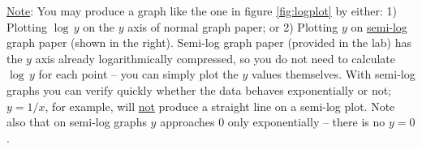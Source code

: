 \begin{minipage}[h]{0.7\textwidth}
    \underline{Note}: You may produce a graph like the one in figure \ref{fig:logplot} by either: 1) Plotting $\log\,y$ on the $y$ axis of normal graph paper; or 2) Plotting $y$ on \underline{semi-log} graph paper (shown in the right). Semi-log graph paper (provided in the lab) has the $y$ axis already logarithmically compressed, so you do not need to calculate $\log\,y$ for each point -- you can simply plot the $y$ values themselves. With semi-log graphs you can verify quickly whether the data behaves exponentially or not; $y = 1/x$, for example, will \underline{not} produce a straight line on a semi-log plot. Note also that on semi-log graphs $y$ approaches 0 only exponentially -- there is no $y=0$.
\end{minipage}
\begin{minipage}[h]{0.3\textwidth}
    \begin{flushright}

\end{flushright}
\end{minipage}

